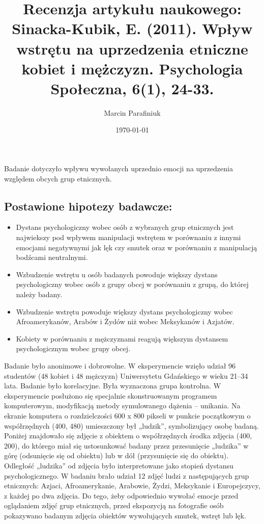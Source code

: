 \documentclass{psychol}
\title{Recenzja artykułu naukowego: Sinacka-Kubik, E. (2011). Wpływ wstrętu na uprzedzenia etniczne kobiet i mężczyzn. Psychologia Społeczna, 6(1), 24-33.}
\author{Marcin Parafiniuk}
\date{\today}
\begin{document}
\maketitle
\doublespacing

\pagebreak


Badanie dotyczyło wpływu wywołanych uprzednio emocji na uprzedzenia względem obcych grup etnicznych.

\subsection{Postawione hipotezy badawcze:}
\begin{itemize}
    \item Dystans psychologiczny wobec osób z wybranych grup etnicznych jest najwiekszy pod wpływem manipulacji wstrętem w porównaniu z innymi emocjami negatywnymi jak lęk czy smutek oraz w porównaniu z manipulacją bodźcami neutralnymi.
    \item Wzbudzenie wstrętu u osób badanych powoduje większy dystans psychologiczny wobec osób z grupy obcej w porównaniu z grupą, do której należy badany.
    \item Wzbudzenie wstrętu powoduje większy dystans psychologiczny wobec Afroamerykanów, Arabów i Żydów niż wobec Meksykanów i Azjatów.
    \item Kobiety w porównaniu z mężczyznami reagują większym dystansem psychologicznym wobec grupy obcej.
\end{itemize}

Badanie było anonimowe i dobrowolne. W  eksperymencie wzięło udział 96 studentów (48 kobiet i 48 mężczyzn) Uniwersytetu Gdańskiego w wieku 21–34 lata. Badanie było korelacyjne. Była wyznaczona grupa kontrolna. W eksperymencie posłużono się specjalnie skonstruowanym programem komputerowym, modyfikacją metody symulowanego dążenia – unikania. Na ekranie komputera o rozdzielczości 600 x 800 pikseli w punkcie początkowym o współrzędnych (400, 480)
umieszczony był „ludzik”, symbolizujący osobę badaną.
Poniżej znajdowało się zdjęcie z obiektem o współrzędnych środka zdjęcia (400, 200), do którego miał się ustosunkować badany przez przesunięcie „ludzika” w górę
(odsunięcie się od obiektu) lub w dół (przysunięcie się
do obiektu). Odległość „ludzika” od zdjęcia było interpretowane jako stopień dystansu psychologicznego. W badaniu brało udział 12 zdjęć ludzi z następujących grup etnicznych: Azjaci, Afroamerykanie, Arabowie,
Żydzi, Meksykanie i Europejczycy, z każdej po dwa zdjęcia. Do tego, żeby odpowiednio wywołać emocje przed oglądaniem zdjęć grup etnicznych, przed ekspozycją na fotografie osób pokazywano badanym zdjęcia obiektów wywołujących smutek, wstręt lub lęk.
\end{document}
